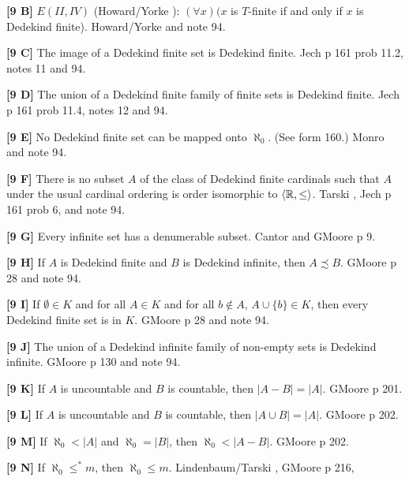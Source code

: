 \smallskip
\item{}{\bf [9 B]} $E(II,IV)$ (\ac{Howard/Yorke} \cite{1989}): $(\forall x)
(x$ is $T$-finite if and only if $x$ is Dedekind finite). \ac{Howard/Yorke}
\cite{1989} and note 94.
\smallskip
\item{}{\bf [9 C]} The image of a Dedekind finite set is Dedekind
finite. \ac{Jech} \cite{1973b} p 161 prob 11.2, notes 11 and 94.
\smallskip
\item{}{\bf [9 D]}  The union of a Dedekind finite family of finite sets
is Dedekind finite. \ac{Jech} \cite{1973b} p 161 prob 11.4, notes
12 and 94.
\smallskip
\item{}{\bf [9 E]} No Dedekind finite set can be mapped onto $\aleph_0$.
(See form 160.) \ac{Monro} \cite{1975} and note 94.
\smallskip
\item{}{\bf [9 F]}  There is no subset $A$ of the class of Dedekind
finite cardinals such that  $A$  under the usual cardinal
ordering is order isomorphic to $\langle{\Bbb R},\le \rangle$.
\ac{Tarski} \cite{1965}, \ac{Jech} \cite{1973b} p 161 prob 6, and note 94.
\smallskip
\item{}{\bf [9 G]} Every infinite set has a denumerable subset.
\ac{Cantor} \cite{1895} and G\. \ac{Moore} \cite{1982} p 9.
\smallskip
\item{}{\bf [9 H]} If $A$ is Dedekind finite and $B$ is Dedekind infinite,
then $A\precsim B$.  G\. \ac{Moore} \cite{1982} p 28 and note 94.
\smallskip
\item{}{\bf [9 I]} If $\emptyset\in K$ and for all $A\in K$ and for all
$b\not\in A$, $A\cup \{b\}\in K$, then every Dedekind finite
set is in $K$.  G\. \ac{Moore} \cite{1982} p 28 and note 94.
\smallskip
\item{}{\bf [9 J]} The union of a Dedekind infinite family of non-empty
sets is Dedekind infinite.  G\. \ac{Moore} \cite{1982} p 130 and note 94.
\smallskip
\item{}{\bf [9 K]} If $A$ is uncountable and $B$ is countable, then $|A-B|
=|A|$.  G\. \ac{Moore} \cite{1982} p 201.
\smallskip
\item{}{\bf [9 L]} If $A$ is uncountable and $B$ is countable, then
$|A\cup B| = |A|$.  G\. \ac{Moore} \cite{1982} p 202.
\smallskip
\item{}{\bf [9 M]} If $\aleph_0 < |A|$ and $\aleph_0 = |B|$, then $\aleph_0
< |A - B|$.  G\. \ac{Moore} \cite{1982} p 202.
\smallskip
\item{}{\bf [9 N]} If $\aleph_0\le^* m$, then $\aleph_0\le m$.
\ac{Lindenbaum/Tarski} \cite{1926}, G\. \ac{Moore} \cite{1982} p 216,
